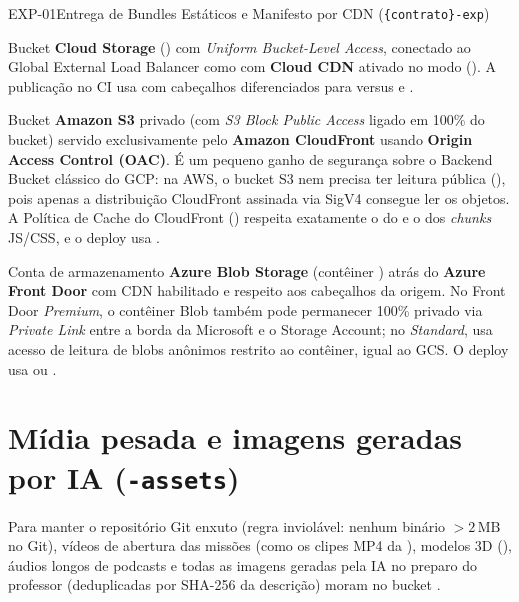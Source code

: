 \begin{pecaarq}{EXP-01}{Entrega de Bundles Estáticos e Manifesto por CDN (\texttt{\{contrato\}-exp})}{\sgcp~\nativo\enspace\saws~\nativo\enspace\sazure~\nativo}
\begin{campos}
  \item[Como é hoje (GCP)] Bucket \textbf{Cloud Storage}
    () com \emph{Uniform Bucket-Level Access}, conectado
    ao Global External Load Balancer como 
    com \textbf{Cloud CDN} ativado no modo 
    (). A publicação no CI usa 
    com cabeçalhos diferenciados para  versus  e
    .
  \item[Equivalente AWS] Bucket \textbf{Amazon S3} privado (com \emph{S3 Block
    Public Access} ligado em 100\% do bucket) servido exclusivamente pelo
    \textbf{Amazon CloudFront} usando \textbf{Origin Access Control (OAC)}. É um
    pequeno ganho de segurança sobre o Backend Bucket clássico do GCP: na AWS, o
    bucket S3 nem precisa ter leitura pública (), pois apenas a
    distribuição CloudFront assinada via SigV4 consegue ler os objetos. A
    Política de Cache do CloudFront () respeita
    exatamente o  do  e o  dos
    \emph{chunks} JS/CSS, e o deploy usa .
  \item[Equivalente Azure] Conta de armazenamento \textbf{Azure Blob Storage}
    (contêiner ) atrás do \textbf{Azure Front Door} com CDN habilitado e
    respeito aos cabeçalhos  da origem. No Front Door
    \emph{Premium}, o contêiner Blob também pode permanecer 100\% privado via
    \emph{Private Link} entre a borda da Microsoft e o Storage Account; no
    \emph{Standard}, usa acesso de leitura de blobs anônimos restrito ao
    contêiner, igual ao GCS. O deploy usa  ou .
\end{campos}
\end{pecaarq}

\section{Mídia pesada e imagens geradas por IA (\texttt{-assets})}

Para manter o repositório Git enxuto (regra inviolável: nenhum binário $>2\,\text{MB}$
no Git), vídeos de abertura das missões (como os clipes MP4 da ),
modelos 3D (), áudios longos de podcasts e todas as
imagens  geradas pela IA no preparo do professor (deduplicadas por
SHA-256 da descrição) moram no bucket .

